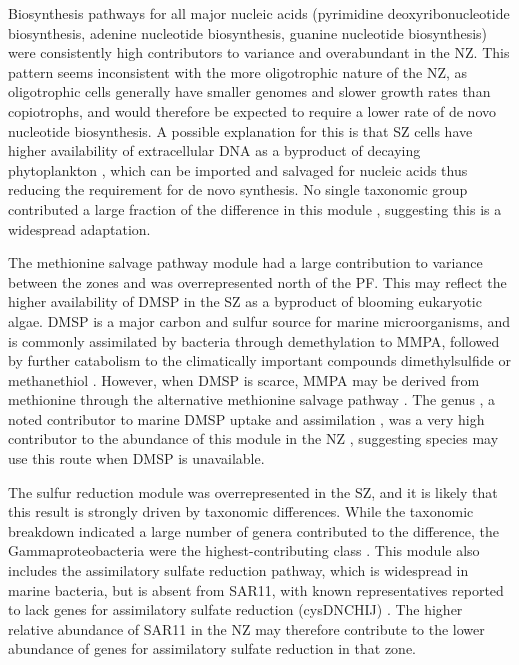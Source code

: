 Biosynthesis pathways for all major nucleic acids (pyrimidine deoxyribonucleotide biosynthesis, adenine nucleotide biosynthesis, guanine nucleotide biosynthesis) were consistently high contributors to variance and overabundant in the \ac{NZ}.
This pattern seems inconsistent with the more oligotrophic nature of the \ac{NZ}, as oligotrophic cells generally have smaller genomes \cite{Lauro:2009gx} and slower growth rates than copiotrophs, and would therefore be expected to require a lower rate of de novo nucleotide biosynthesis.
A possible explanation for this is that \ac{SZ} cells have higher availability of extracellular DNA as a byproduct of decaying phytoplankton \cite{Lomas:2011bp}, which can be imported and salvaged for nucleic acids \cite{Paul:1988wn} thus reducing the requirement for de novo synthesis.
No single taxonomic group contributed a large fraction of the difference in this module , suggesting this is a widespread adaptation.

The methionine salvage pathway module had a large contribution to variance between the zones and was overrepresented north of the \ac{PF}.
This may reflect the higher availability of \ac{DMSP} in the \ac{SZ} as a byproduct of blooming eukaryotic algae.
\ac{DMSP} is a major carbon and sulfur source for marine microorganisms, and is commonly assimilated by bacteria through demethylation to \ac{MMPA}, followed by further catabolism to the climatically important compounds dimethylsulfide or methanethiol \citep[review in][]{Curson:2011ic}.
However, when \ac{DMSP} is scarce, \ac{MMPA} may be derived from methionine through the alternative methionine salvage pathway \cite{Reisch:2012bb}.
The genus , a noted contributor to marine \ac{DMSP} uptake and assimilation \cite{VilaCosta:2006gt}, was a very high contributor to the abundance of this module in the \ac{NZ} , suggesting  species may use this route when \ac{DMSP} is unavailable.

The sulfur reduction module was overrepresented in the \ac{SZ}, and it is likely that this result is strongly driven by taxonomic differences.
While the taxonomic breakdown indicated a large number of genera contributed to the difference, the Gammaproteobacteria were the highest-contributing class .
This module also includes the assimilatory sulfate reduction pathway, which is widespread in marine bacteria, but is absent from SAR11, with known representatives reported to lack genes for assimilatory sulfate reduction (cysDNCHIJ) \cite{Tripp:2008dd}.
The higher relative abundance of SAR11 in the \ac{NZ} may therefore contribute to the lower abundance of genes for assimilatory sulfate reduction in that zone. 

